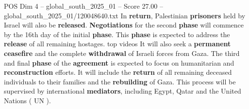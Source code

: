 \begin{textsample}{POS Dim 4 – global\_south\_2025\_01 – Score 27.00 – global\_south\_2025\_01/120048640.txt}
In \textbf{return}, Palestinian \textbf{prisoners} held by Israel will also be \textbf{released}. \textbf{Negotiations} for the second \textbf{phase} will commence by the 16th day of the initial \textbf{phase}.
This \textbf{phase} is expected to address the \textbf{release} of all remaining hostages. top videos It will also seek a \textbf{permanent} \textbf{ceasefire} and the complete \textbf{withdrawal} of Israeli forces from Gaza.
The third and final \textbf{phase} of the \textbf{agreement} is expected to focus on humanitarian and \textbf{reconstruction} efforts.
It will include the \textbf{return} of all remaining deceased individuals to their families and the \textbf{rebuilding} of Gaza.
This process will be supervised by international \textbf{mediators}, including Egypt, Qatar and the United Nations ( UN ).

\end{textsample}
